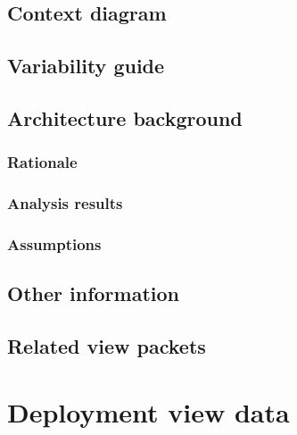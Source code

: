 \documentclass[a4paper,10pt]{paper}
\begin{document}
\subsection{Context diagram}

\subsection{Variability guide}

\subsection{Architecture background}

\subsubsection{Rationale}

\subsubsection{Analysis results}

\subsubsection{Assumptions}

\subsection{Other information}

\subsection{Related view packets}



\section{Deployment view data}
\end{document}

